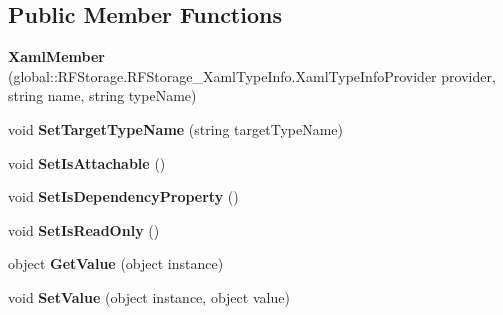 \subsection*{Public Member Functions}
\begin{DoxyCompactItemize}
\item 
\mbox{\label{class_r_f_storage_1_1_r_f_storage___xaml_type_info_1_1_xaml_member_a26201e0a120de69a575ecf8fe8bb0f85}} 
{\bfseries Xaml\+Member} (global\+::\+R\+F\+Storage.\+R\+F\+Storage\+\_\+\+Xaml\+Type\+Info.\+Xaml\+Type\+Info\+Provider provider, string name, string type\+Name)
\item 
\mbox{\label{class_r_f_storage_1_1_r_f_storage___xaml_type_info_1_1_xaml_member_a18486fd86fb2632112b66726448929ee}} 
void {\bfseries Set\+Target\+Type\+Name} (string target\+Type\+Name)
\item 
\mbox{\label{class_r_f_storage_1_1_r_f_storage___xaml_type_info_1_1_xaml_member_ae9ca78742a9519ca0f82d645927e87ed}} 
void {\bfseries Set\+Is\+Attachable} ()
\item 
\mbox{\label{class_r_f_storage_1_1_r_f_storage___xaml_type_info_1_1_xaml_member_a46d590e3fea924a44b261e153ab4efb0}} 
void {\bfseries Set\+Is\+Dependency\+Property} ()
\item 
\mbox{\label{class_r_f_storage_1_1_r_f_storage___xaml_type_info_1_1_xaml_member_ae4abdb0d9aaf1c97c08da7c6e0863a03}} 
void {\bfseries Set\+Is\+Read\+Only} ()
\item 
\mbox{\label{class_r_f_storage_1_1_r_f_storage___xaml_type_info_1_1_xaml_member_a8e9ff39ec294c5ca665c7dab2adc6b55}} 
object {\bfseries Get\+Value} (object instance)
\item 
\mbox{\label{class_r_f_storage_1_1_r_f_storage___xaml_type_info_1_1_xaml_member_a3560e03ec2542eb1281f63661beeda1e}} 
void {\bfseries Set\+Value} (object instance, object value)
\end{DoxyCompactItemize}
